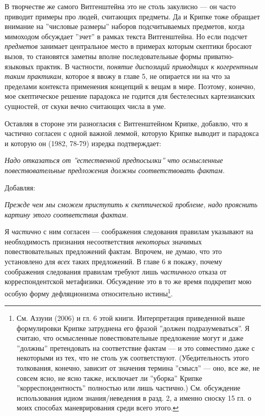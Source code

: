 \documentclass[11pt]{book}
\begin{document}
В творчестве же самого Витгенштейна это не столь закулисно --- он часто приводит примеры про людей, считающих предметы. Да и Крипке тоже обращает внимание на ''числовые размеры'' наборов подсчитываемых предметов, когда мимоходом обсуждает ''зчет'' в рамках текста Витгенштейна. Но если подсчет \textit{предметов} занимает центральное место в примерах которым скептики бросают вызов, то становятся заметны вполне последовательные формы приватно-языковых практик. В частности, \textit{понятие диспозиций приводящих к когерентным таким практикам}, которое я ввожу в главе 5, не опирается ни на что за пределами контекста применения концепций к вещам в мире. Поэтому, конечно, мое скептическое решение парадокса не годится для бестелесных картезианских сущностей, от скуки вечно считающих числа в уме.

Оставляя в стороне эти разногласия с Витгенштейном Крипке, добавлю, что я частично согласен с одной важной леммой, которую Крипке выводит и парадокса и которую он (1982, 78-79) изредка подтверждает:

\smallskip

\textit{Надо отказаться от ''естественной предпосылки'' что осмысленные повествовательные предложения должны соответствовать фактам.}

\smallskip

Добавляя:

\smallskip

\textit{Прежде чем мы сможем приступить к скептической проблеме, надо прояснить картину этого соответствия фактам.}

\smallskip

Я \textit{частично} с ним согласен --- соображения следования правилам указывают на необходимость признания несоответствия \textit{некоторых} значимых повествовательных предложений фактам. Впрочем, не думаю, что это установлено для \textit{всех} таких предложений. В главе 6 я покажу, почему соображения следования правилам требуют лишь \textit{частичного} отказа от корреспондентской метафизики. Обсуждение это в то же время подкрепит мою особую форму дефляционизма относительно истины\footnote{См. Аззуни (2006) и гл. 6 этой книги. Интерпретация приведенной выше формулировки Крипке затруднена его фразой ''должен подразумеваться''. Я считаю, что осмысленные повествовательные предложение могут и даже ''должны'' претендовать на соответствие фактам --- и это совместимо даже с некоторыми из тех, что не столь уж соответствуют. (Убедительность этого толкования, конечно, зависит от значения термина ''смысл'' --- оно, все же, не совсем ясно, не ясно также, исключает ли ''уборка'' Крипке ''корреспондентность'' полностью или лишь частично.) См. обсуждение использования идиом знания/неведения в разд. 2, а именно сноску 15 гл. о моих способах маневрирования среди всего этого.}.
\end{document}
